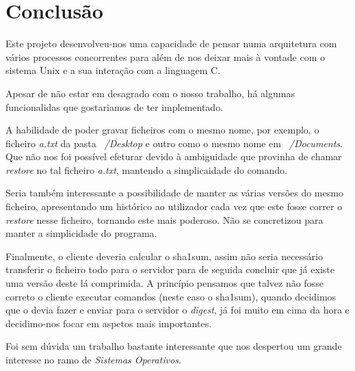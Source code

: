 \documentclass[12pt,a4paper]{report}
\begin{document}
\chapter{Conclusão}
Este projeto desenvolveu-nos uma capacidade de pensar numa arquitetura com vários processos concorrentes  para além de nos deixar mais à vontade com o sistema Unix e a sua interação com a linguagem C.\par
Apesar de não estar em desagrado com o nosso trabalho, há algumas funcionalidas que gostariamos de ter implementado.\par
A habilidade de poder gravar ficheiros com o mesmo nome, por exemplo, o ficheiro \emph{a.txt} da pasta \emph{~/Desktop} e outro como o mesmo nome em \emph{~/Documents}. Que não nos foi possível efeturar devido à ambiguidade que provinha de chamar \emph{restore} no tal ficheiro \emph{a.txt}, mantendo a simplicaidade do comando.\par
Seria também interessante a possibilidade de manter as várias versões do mesmo ficheiro, apresentando um histórico ao utilizador cada vez que este fosse correr o \emph{restore} nesse ficheiro, tornando este mais poderoso. Não se concretizou para manter a simplicidade do programa.\par
Finalmente, o cliente deveria calcular o sha1sum, assim não seria necessário transferir o ficheiro todo para o servidor para de seguida concluir que já existe uma versão deste lá comprimida. A princípio pensamos que talvez não fosse correto o cliente executar comandos (neste caso o sha1sum), quando decidimos que o devia fazer e enviar para o servidor o \emph{digest}, já foi muito em cima da hora e decidimo-nos focar em aspetos mais importantes.\par
Foi sem dúvida um trabalho bastante interessante que nos despertou um grande interesse no ramo de \emph{Sistemas Operativos}.
\end{document}
